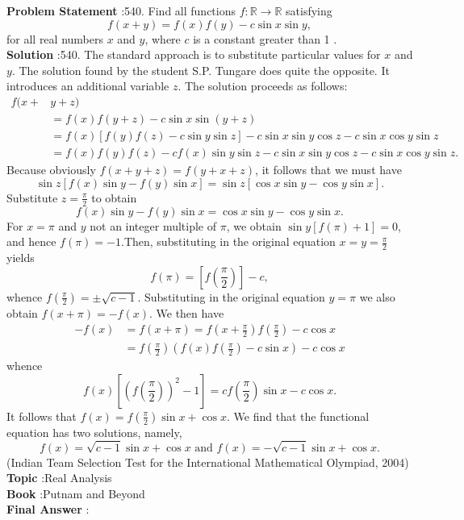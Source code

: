 \documentclass[10pt]{article}
\begin{document}
\textbf{Problem Statement} :540. Find all functions $f: \mathbb{R} \rightarrow \mathbb{R}$ satisfying$$ f(x+y)=f(x) f(y)-c \sin x \sin y, $$for all real numbers $x$ and $y$, where $c$ is a constant greater than 1 .\\
\textbf{Solution} :540. The standard approach is to substitute particular values for $x$ and $y$. The solution found by the student S.P. Tungare does quite the opposite. It introduces an additional variable $z$. The solution proceeds as follows:$$ \begin{aligned} f(x+&y+z) \\ &=f(x) f(y+z)-c \sin x \sin (y+z) \\ &=f(x)[f(y) f(z)-c \sin y \sin z]-c \sin x \sin y \cos z-c \sin x \cos y \sin z \\ &=f(x) f(y) f(z)-c f(x) \sin y \sin z-c \sin x \sin y \cos z-c \sin x \cos y \sin z . \end{aligned} $$Because obviously $f(x+y+z)=f(y+x+z)$, it follows that we must have$$ \sin z[f(x) \sin y-f(y) \sin x]=\sin z[\cos x \sin y-\cos y \sin x] . $$Substitute $z=\frac{\pi}{2}$ to obtain$$ f(x) \sin y-f(y) \sin x=\cos x \sin y-\cos y \sin x . $$For $x=\pi$ and $y$ not an integer multiple of $\pi$, we obtain $\sin y[f(\pi)+1]=0$, and hence $f(\pi)=-1$.Then, substituting in the original equation $x=y=\frac{\pi}{2}$ yields$$ f(\pi)=\left[f\left(\frac{\pi}{2}\right)\right]-c, $$whence $f\left(\frac{\pi}{2}\right)=\pm \sqrt{c-1}$. Substituting in the original equation $y=\pi$ we also obtain $f(x+\pi)=-f(x)$. We then have$$ \begin{aligned} -f(x) &=f(x+\pi)=f\left(x+\frac{\pi}{2}\right) f\left(\frac{\pi}{2}\right)-c \cos x \\ &=f\left(\frac{\pi}{2}\right)\left(f(x) f\left(\frac{\pi}{2}\right)-c \sin x\right)-c \cos x \end{aligned} $$whence$$ f(x)\left[\left(f\left(\frac{\pi}{2}\right)\right)^{2}-1\right]=c f\left(\frac{\pi}{2}\right) \sin x-c \cos x . $$It follows that $f(x)=f\left(\frac{\pi}{2}\right) \sin x+\cos x$. We find that the functional equation has two solutions, namely,$$ f(x)=\sqrt{c-1} \sin x+\cos x \text { and } f(x)=-\sqrt{c-1} \sin x+\cos x . $$(Indian Team Selection Test for the International Mathematical Olympiad, 2004)\\
\textbf{Topic} :Real Analysis\\
\textbf{Book} :Putnam and Beyond\\
\textbf{Final Answer} :\\
\end{document}
